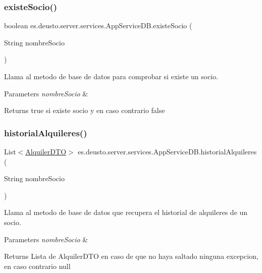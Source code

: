 \subsubsection{\texorpdfstring{existeSocio()}{existeSocio()}}
{\footnotesize\ttfamily boolean es.\+deusto.\+server.\+services.\+App\+Service\+D\+B.\+existe\+Socio (\begin{DoxyParamCaption}\item[{String}]{nombre\+Socio }\end{DoxyParamCaption})}

Llama al metodo de base de datos para comprobar si existe un socio. 
\begin{DoxyParams}{Parameters}
{\em nombre\+Socio} & \\
\hline
\end{DoxyParams}
\begin{DoxyReturn}{Returns}
true si existe socio y en caso contrario false 
\end{DoxyReturn}
\mbox{\label{classes_1_1deusto_1_1server_1_1services_1_1_app_service_d_b_a362c47422ee87ea594ccf6c7884ce053}} 
\subsubsection{\texorpdfstring{historialAlquileres()}{historialAlquileres()}}
{\footnotesize\ttfamily List$<$\mbox{\hyperlink{classes_1_1deusto_1_1server_1_1dto_1_1_alquiler_d_t_o}{Alquiler\+D\+TO}}$>$ es.\+deusto.\+server.\+services.\+App\+Service\+D\+B.\+historial\+Alquileres (\begin{DoxyParamCaption}\item[{String}]{nombre\+Socio }\end{DoxyParamCaption})}

Llama al metodo de base de datos que recupera el historial de alquileres de un socio. 
\begin{DoxyParams}{Parameters}
{\em nombre\+Socio} & \\
\hline
\end{DoxyParams}
\begin{DoxyReturn}{Returns}
Lista de Alquiler\+D\+TO en caso de que no haya saltado ninguna excepcion, en caso contrario null 
\end{DoxyReturn}
\mbox{\label{classes_1_1deusto_1_1server_1_1services_1_1_app_service_d_b_a05bb94be097db4d37ed29533ffef22bd}} 
